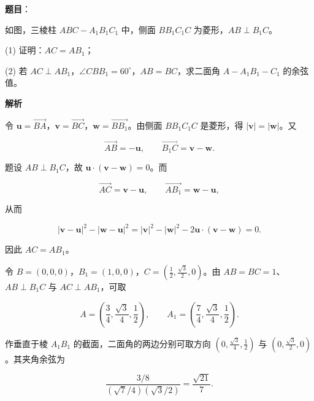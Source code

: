 \begin{answer}

\textbf{题目}：

如图，三棱柱 $ABC-A_1B_1C_1$ 中，侧面 $BB_1C_1C$ 为菱形，$AB\perp B_1C$。
\nopagebreak[4]
\begin{center}\end{center}
\nopagebreak[4]
(1) 证明：$AC=AB_1$；

(2) 若 $AC\perp AB_1$，$\angle CBB_1=60^\circ$，$AB=BC$，求二面角 $A-A_1B_1-C_1$ 的余弦值。

\textbf{解析}


令 $\boldsymbol u=\overrightarrow{BA}$，$\boldsymbol v=\overrightarrow{BC}$，$\boldsymbol w=\overrightarrow{BB_1}$。由侧面 $BB_1C_1C$ 是菱形，得 $|\boldsymbol v|=|\boldsymbol w|$。又

\nopagebreak[4]
\[
\overrightarrow{AB}=-\boldsymbol u,\qquad
\overrightarrow{B_1C}=\boldsymbol v-\boldsymbol w.
\]

题设 $AB\perp B_1C$，故 $\boldsymbol u\cdot(\boldsymbol v-\boldsymbol w)=0$。而

\nopagebreak[4]
\[
\overrightarrow{AC}=\boldsymbol v-\boldsymbol u,\qquad
\overrightarrow{AB_1}=\boldsymbol w-\boldsymbol u,
\]

从而

\nopagebreak[4]
\[
|\boldsymbol v-\boldsymbol u|^2-|\boldsymbol w-\boldsymbol u|^2
=|\boldsymbol v|^2-|\boldsymbol w|^2-2\boldsymbol u\cdot(\boldsymbol v-\boldsymbol w)=0.
\]

因此 $AC=AB_1$。


令 $B=(0,0,0)$，$B_1=(1,0,0)$，$C=(\tfrac12,\tfrac{\sqrt3}{2},0)$。由 $AB=BC=1$、$AB\perp B_1C$ 与 $AC\perp AB_1$，可取

\nopagebreak[4]
\[
A=\left(\frac34,\frac{\sqrt3}{4},\frac12\right),\qquad
A_1=\left(\frac74,\frac{\sqrt3}{4},\frac12\right).
\]

作垂直于棱 $A_1B_1$ 的截面，二面角的两边分别可取方向 $(0,\tfrac{\sqrt3}{4},\tfrac12)$ 与 $(0,\tfrac{\sqrt3}{2},0)$。其夹角余弦为

\nopagebreak[4]
\[
\frac{3/8}{(\sqrt7/4)(\sqrt3/2)}=\frac{\sqrt{21}}7.
\]



\end{answer}
